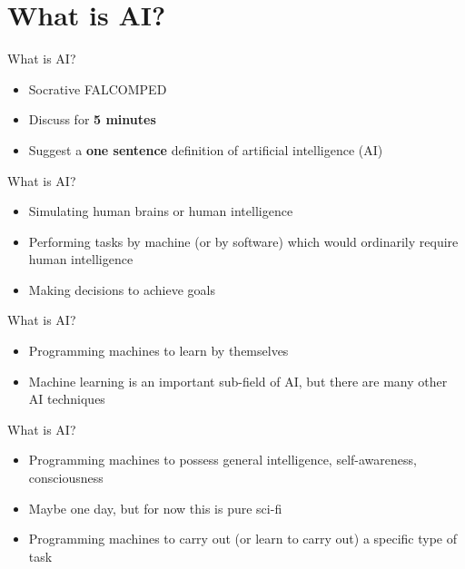 \part{What is AI?}
\frame{\partpage}

\begin{frame}{What is AI?}
	\begin{itemize}
		\item Socrative FALCOMPED
		\item Discuss for \textbf{5 minutes}
		\item Suggest a \textbf{one sentence} definition of artificial intelligence (AI)
	\end{itemize}
\end{frame}

\begin{frame}{What is AI?}
    \begin{itemize}
        \pause\item[\xmark] Simulating human brains or human intelligence
        \pause\item[\cmark] Performing tasks by machine (or by software) which would ordinarily require human intelligence
        \pause\item[\cmark] Making decisions to achieve goals
    \end{itemize}
\end{frame}

\begin{frame}{What is AI?}
    \begin{itemize}
        \pause\item[\xmark] Programming machines to learn by themselves
        \pause\item[\cmark] Machine learning is an important sub-field of AI, but there are many other AI techniques
    \end{itemize}
\end{frame}

\begin{frame}{What is AI?}
    \begin{itemize}
        \pause\item[\xmark] Programming machines to possess general intelligence, self-awareness, consciousness
        \pause\item[\cmark] Maybe one day, but for now this is pure sci-fi
        \pause\item[\cmark] Programming machines to carry out (or learn to carry out) a specific type of task
    \end{itemize}
\end{frame}

